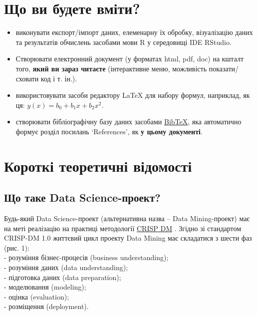 \documentclass[
]{book}
\providecommand{\tightlist}{%
  \setlength{\itemsep}{0pt}\setlength{\parskip}{0pt}}
\begin{document}
\hypertarget{ux449ux43e-ux432ux438-ux431ux443ux434ux435ux442ux435-ux432ux43cux456ux442ux438}{%
\section{Що ви будете вміти?}\label{ux449ux43e-ux432ux438-ux431ux443ux434ux435ux442ux435-ux432ux43cux456ux442ux438}}

\begin{itemize}
\tightlist
\item
  виконувати експорт/імпорт даних, елеменарну їх обробку, візуалізацію даних та результатів обчислень засобами мови R у середовищі IDE RStudio.
\item
  Створювати електронний документ (у форматах html, pdf, doc) на кшталт того, \textbf{який ви зараз читаєте} (інтерактивне меню, можливість показати/сховати код і т. ін.).
\item
  використовувати засоби редактору LaTeX для набору формул, наприклад, як ця: \(y(x)=b_0+b_1x+b_2x^2\).
\item
  створювати бібліографічну базу даних засобами \href{https://ru.wikipedia.org/wiki/BibTeX}{BibTeX}, яка автоматично формує розділ посилань `References', як \textbf{у цьому документі}.
\end{itemize}

\hypertarget{ux43aux43eux440ux43eux442ux43aux456-ux442ux435ux43eux440ux435ux442ux438ux447ux43dux456-ux432ux456ux434ux43eux43cux43eux441ux442ux456}{%
\section{Короткі теоретичні відомості}\label{ux43aux43eux440ux43eux442ux43aux456-ux442ux435ux43eux440ux435ux442ux438ux447ux43dux456-ux432ux456ux434ux43eux43cux43eux441ux442ux456}}

\hypertarget{ux449ux43e-ux442ux430ux43aux435-data-science-ux43fux440ux43eux435ux43aux442}{%
\subsection{Що таке Data Science-проект?}\label{ux449ux43e-ux442ux430ux43aux435-data-science-ux43fux440ux43eux435ux43aux442}}

Будь-який Data Science-проект (альтернативна назва -- Data Mining-проект) має на меті реалізацію на практиці методології \href{https://www.the-modeling-agency.com/crisp-dm.pdf}{CRISP DM} \citep{CRISP_DM}. Згідно зі стандартом CRISP-DM 1.0 життєвий цикл проекту Data Mining має складатися з шести фаз (рис. 1):\\
- розуміння бізнес-процесів (business understanding);\\
- розуміння даних (data understanding);\\
- підготовка даних (data preparation);\\
- моделювання (modeling);\\
- оцінка (evaluation);\\
- розміщення (deployment).
\end{document}
